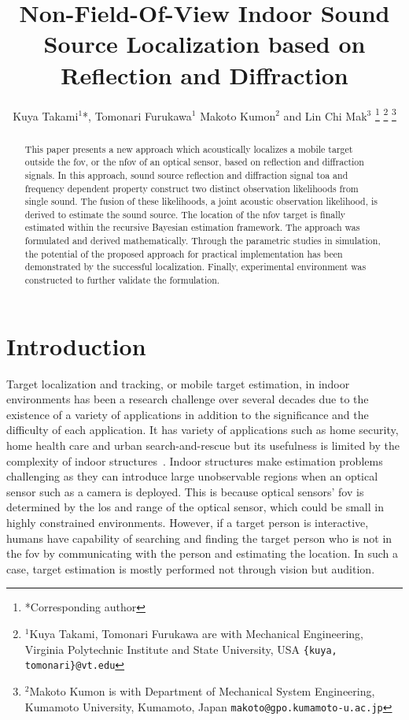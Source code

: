 \documentclass[letterpaper, 10 pt, conference]{ieeeconf}  %
\title{\LARGE \bf
Non-Field-Of-View Indoor Sound Source Localization based on Reflection and Diffraction
}
\author{Kuya Takami$^{1}$*, Tomonari Furukawa$^{1}$ Makoto Kumon$^{2}$ and Lin Chi Mak$^{3}$%
\thanks{*Corresponding author}%
\thanks{$^{1}$Kuya Takami, Tomonari Furukawa are with Mechanical Engineering, Virginia Polytechnic Institute and State University, USA
        {\tt\small \{kuya, tomonari\}@vt.edu}}
\thanks{$^{2}$Makoto Kumon is with Department of Mechanical System Engineering, Kumamoto University, Kumamoto, Japan
        {\tt\small makoto@gpo.kumamoto-u.ac.jp}}}
\begin{document}
\maketitle
\thispagestyle{empty}
\pagestyle{empty}
\begin{abstract}
This paper presents a new approach which acoustically localizes a mobile target outside the \gls{fov}, or the \gls{nfov} of an optical sensor, based on reflection and diffraction signals. In this approach, sound source reflection and diffraction signal \gls{toa} and frequency dependent property construct two distinct observation likelihoods from single sound. The fusion of these likelihoods, a joint acoustic observation likelihood, is derived to estimate the sound source. The location of the \gls{nfov} target is finally estimated within the recursive Bayesian estimation framework. The approach was formulated and derived mathematically. Through the parametric studies in simulation, the potential of the proposed approach for practical implementation has been demonstrated by the successful localization. Finally, experimental environment was constructed to further validate the formulation.
\end{abstract}
\section{Introduction}
Target localization and tracking, or mobile target estimation, in indoor environments has been a research challenge over several decades due to the existence of a variety of applications in addition to the significance and the difficulty of each application. It has variety of applications such as home security, home health care and urban search-and-rescue but its usefulness is limited by the complexity of indoor structures~\cite{priyantha2005mobile,Khoury2009,argentieri2014survey}. Indoor structures make estimation problems challenging as they can introduce large unobservable regions when an optical sensor such as a camera is deployed.  This is because optical sensors' \acrfull{fov} is determined by the \gls{los} and range of the optical sensor, which could be small in highly constrained environments. However, if a target person is interactive, humans have capability of searching and finding the target person who is not in the \gls{fov} by communicating with the person and estimating the location. In such a case, target estimation is mostly performed not through vision but audition. 
\end{document}
